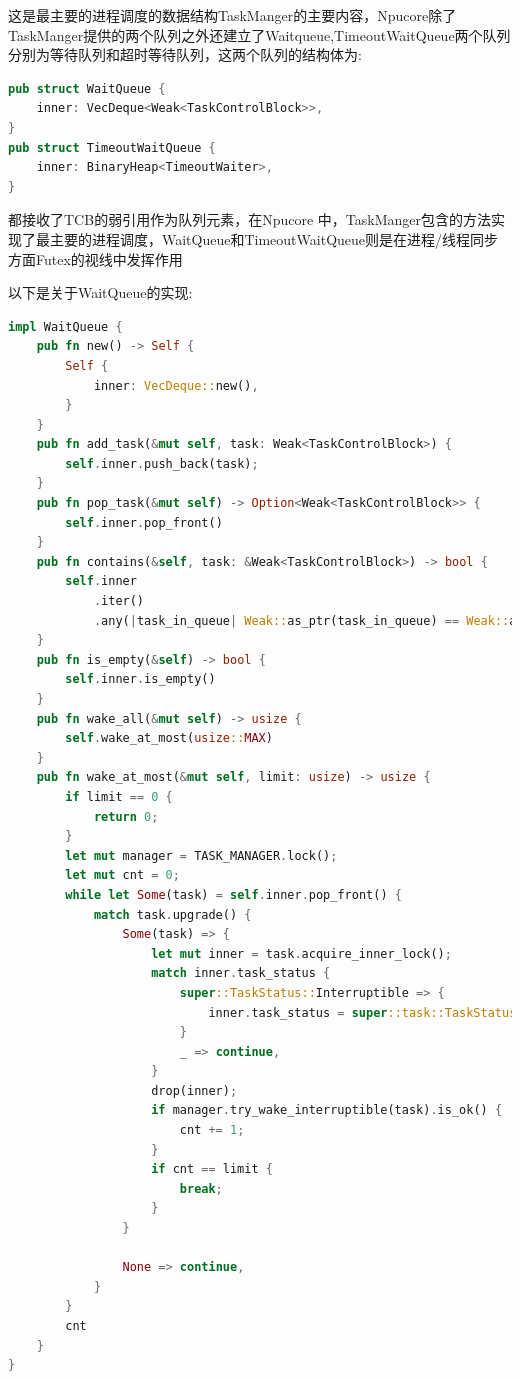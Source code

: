 这是最主要的进程调度的数据结构TaskManger的主要内容，Npucore除了TaskManger提供的两个队列之外还建立了Waitqueue,TimeoutWaitQueue两个队列分别为等待队列和超时等待队列，这两个队列的结构体为:
\begin{lstlisting}[language=rust]
    pub struct WaitQueue {
    inner: VecDeque<Weak<TaskControlBlock>>,
}
pub struct TimeoutWaitQueue {
    inner: BinaryHeap<TimeoutWaiter>,
}
\end{lstlisting}
都接收了TCB的弱引用作为队列元素，在Npucore 中，TaskManger包含的方法实现了最主要的进程调度，WaitQueue和TimeoutWaitQueue则是在进程/线程同步方面Futex的视线中发挥作用

以下是关于WaitQueue的实现:
\begin{lstlisting}[language=rust]
    impl WaitQueue {
    pub fn new() -> Self {
        Self {
            inner: VecDeque::new(),
        }
    }
    pub fn add_task(&mut self, task: Weak<TaskControlBlock>) {
        self.inner.push_back(task);
    }
    pub fn pop_task(&mut self) -> Option<Weak<TaskControlBlock>> {
        self.inner.pop_front()
    }
    pub fn contains(&self, task: &Weak<TaskControlBlock>) -> bool {
        self.inner
            .iter()
            .any(|task_in_queue| Weak::as_ptr(task_in_queue) == Weak::as_ptr(task))
    }
    pub fn is_empty(&self) -> bool {
        self.inner.is_empty()
    }
    pub fn wake_all(&mut self) -> usize {
        self.wake_at_most(usize::MAX)
    }
    pub fn wake_at_most(&mut self, limit: usize) -> usize {
        if limit == 0 {
            return 0;
        }
        let mut manager = TASK_MANAGER.lock();
        let mut cnt = 0;
        while let Some(task) = self.inner.pop_front() {
            match task.upgrade() {
                Some(task) => {
                    let mut inner = task.acquire_inner_lock();
                    match inner.task_status {
                        super::TaskStatus::Interruptible => {
                            inner.task_status = super::task::TaskStatus::Ready
                        }
                        _ => continue,
                    }
                    drop(inner);
                    if manager.try_wake_interruptible(task).is_ok() {
                        cnt += 1;
                    }
                    if cnt == limit {
                        break;
                    }
                }
            
                None => continue,
            }
        }
        cnt
    }
}
\end{lstlisting}
